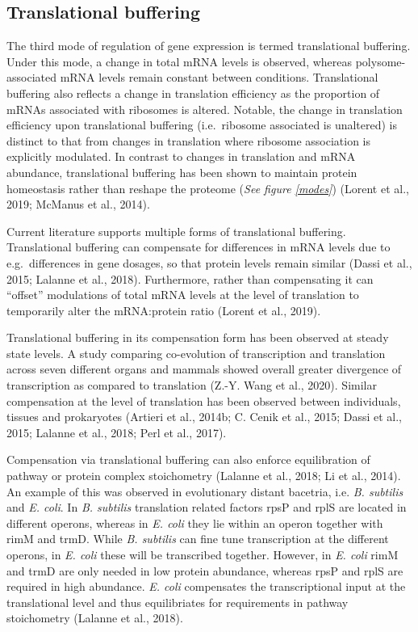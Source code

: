 \documentclass[12pt,openany]{book}
\begin{document}
\subsection{Translational buffering} \label{modeBuffering}

The third mode of regulation of gene expression is termed translational
buffering. Under this mode, a change in total mRNA levels is observed,
whereas polysome-associated mRNA levels remain constant between
conditions. Translational buffering also reflects a change in
translation efficiency as the proportion of mRNAs associated with
ribosomes is altered. Notable, the change in translation efficiency upon
translational buffering (i.e.~ribosome associated is unaltered) is
distinct to that from changes in translation where ribosome association
is explicitly modulated. In contrast to changes in translation and mRNA
abundance, translational buffering has been shown to maintain protein
homeostasis rather than reshape the proteome (\emph{See figure
\ref{modes}}) (Lorent et al., 2019; McManus et al., 2014).

Current literature supports multiple forms of translational buffering.
Translational buffering can compensate for differences in mRNA levels
due to e.g.~differences in gene dosages, so that protein levels remain
similar (Dassi et al., 2015; Lalanne et al., 2018). Furthermore, rather
than compensating it can ``offset'' modulations of total mRNA levels at
the level of translation to temporarily alter the mRNA:protein ratio
(Lorent et al., 2019).

Translational buffering in its compensation form has been observed at
steady state levels. A study comparing co-evolution of transcription and
translation across seven different organs and mammals showed overall
greater divergence of transcription as compared to translation (Z.-Y.
Wang et al., 2020). Similar compensation at the level of translation has
been observed between individuals, tissues and prokaryotes (Artieri et
al., 2014b; C. Cenik et al., 2015; Dassi et al., 2015; Lalanne et al.,
2018; Perl et al., 2017).

Compensation via translational buffering can also enforce equilibration
of pathway or protein complex stoichometry (Lalanne et al., 2018; Li et
al., 2014). An example of this was observed in evolutionary distant
bacetria, i.e. \emph{B. subtilis} and \emph{E. coli}. In \emph{B.
subtilis} translation related factors rpsP and rplS are located in
different operons, whereas in \emph{E. coli} they lie within an operon
together with rimM and trmD. While \emph{B. subtilis} can fine tune
transcription at the different operons, in \emph{E. coli} these will be
transcribed together. However, in \emph{E. coli} rimM and trmD are only
needed in low protein abundance, whereas rpsP and rplS are required in
high abundance. \emph{E. coli} compensates the transcriptional input at
the translational level and thus equilibriates for requirements in
pathway stoichometry (Lalanne et al., 2018).
\end{document}
